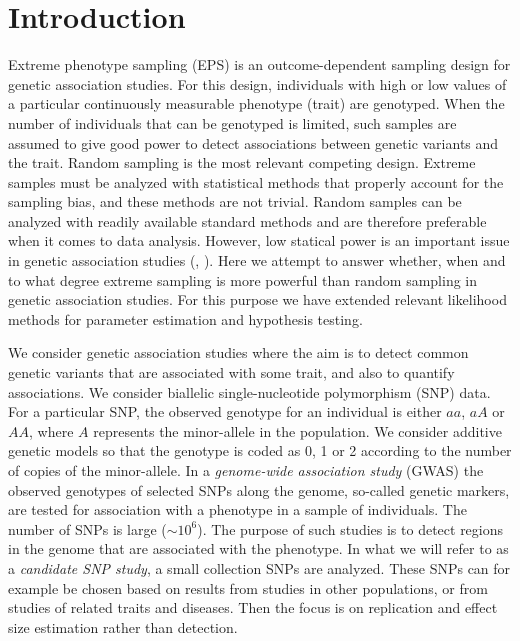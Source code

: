 \documentclass[10pt,a4paper]{article}
\begin{document}
\section{Introduction}
Extreme phenotype sampling (EPS) is an outcome-dependent sampling design for genetic association studies. For this design, individuals with high or low values of a particular continuously measurable phenotype (trait) are genotyped. When the number of individuals that can be genotyped is limited, such samples are assumed to give good power to detect associations between genetic variants and the trait. Random sampling is the most relevant competing design. Extreme samples must be analyzed with statistical methods that properly account for the sampling bias, and these methods are not trivial. Random samples can be analyzed with readily available standard methods and are therefore preferable when it comes to data analysis. However, low statical power is an important issue in genetic association studies (\cite{sham2014statistical}, \cite{hirschhorn2002comprehensive}). Here we attempt to answer whether, when and to what degree extreme sampling is more powerful than random sampling in genetic association studies. For this purpose we have extended relevant likelihood methods for parameter estimation and hypothesis testing. 

We consider genetic association studies where the aim is to detect common genetic variants that are associated with some trait, and also to quantify associations. We consider biallelic single-nucleotide polymorphism (SNP) data. For a particular SNP, the observed genotype for an individual is either $aa$, $aA$ or $AA$, where $A$ represents the minor-allele in the population. We consider additive genetic models so that the genotype is coded as 0, 1 or 2 according to the number of copies of the minor-allele. In a \textit{genome-wide association study} (GWAS) the observed genotypes of selected SNPs along the genome, so-called genetic markers, are tested for association with a phenotype in a sample of individuals. The number of SNPs is large ($\sim 10^6$). The purpose of such studies is to detect regions in the genome that are associated with the phenotype. In what we will refer to as a \textit{candidate SNP study}, a small collection SNPs are analyzed. These SNPs can for example be chosen based on results from studies in other populations, or from studies of related traits and diseases. Then the focus is on replication and effect size estimation rather than detection.
\end{document}

